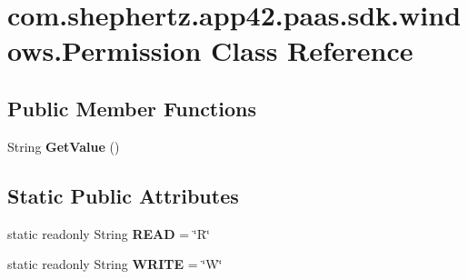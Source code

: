 \hypertarget{classcom_1_1shephertz_1_1app42_1_1paas_1_1sdk_1_1windows_1_1_permission}{\section{com.\+shephertz.\+app42.\+paas.\+sdk.\+windows.\+Permission Class Reference}
\label{classcom_1_1shephertz_1_1app42_1_1paas_1_1sdk_1_1windows_1_1_permission}
}
\subsection*{Public Member Functions}
\begin{DoxyCompactItemize}
\item 
\hypertarget{classcom_1_1shephertz_1_1app42_1_1paas_1_1sdk_1_1windows_1_1_permission_a2c6a09009be60825615ba3a005ec3592}{String {\bfseries Get\+Value} ()}\label{classcom_1_1shephertz_1_1app42_1_1paas_1_1sdk_1_1windows_1_1_permission_a2c6a09009be60825615ba3a005ec3592}

\end{DoxyCompactItemize}
\subsection*{Static Public Attributes}
\begin{DoxyCompactItemize}
\item 
\hypertarget{classcom_1_1shephertz_1_1app42_1_1paas_1_1sdk_1_1windows_1_1_permission_a93df14dd0f466df317f28094db0e9baa}{static readonly String {\bfseries R\+E\+A\+D} = \char`\"{}R\char`\"{}}\label{classcom_1_1shephertz_1_1app42_1_1paas_1_1sdk_1_1windows_1_1_permission_a93df14dd0f466df317f28094db0e9baa}

\item 
\hypertarget{classcom_1_1shephertz_1_1app42_1_1paas_1_1sdk_1_1windows_1_1_permission_aaa3221e4fc79ef0b2238953057bcdd1a}{static readonly String {\bfseries W\+R\+I\+T\+E} = \char`\"{}W\char`\"{}}\label{classcom_1_1shephertz_1_1app42_1_1paas_1_1sdk_1_1windows_1_1_permission_aaa3221e4fc79ef0b2238953057bcdd1a}

\end{DoxyCompactItemize}
